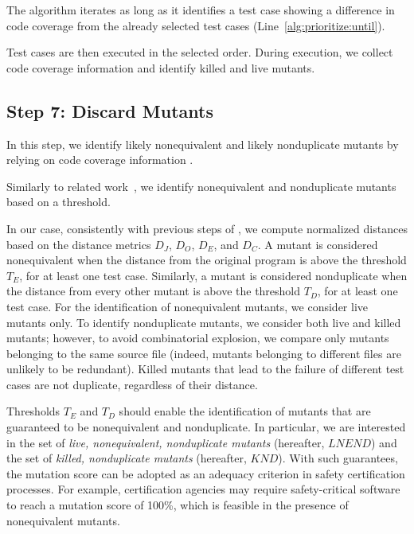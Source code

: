The algorithm iterates as long as it identifies a test case
showing a difference in code coverage from the
already selected test cases (Line~\ref{alg:prioritize:until}).

Test cases are then executed in the selected order. During  execution, we collect code coverage information and identify killed and live mutants.




\subsection{Step 7: Discard Mutants}
\label{sec:algostepSeven}


In this step, we identify likely nonequivalent and likely nonduplicate mutants by relying on code coverage information .

Similarly to related work~\cite{schuler2013covering},
we identify nonequivalent and nonduplicate mutants based on a threshold.

In our case, consistently with previous steps of \APPR,
we compute normalized distances based on the distance metrics $D_J$, $D_O$, $D_E$, and $D_C$. A mutant is considered nonequivalent when the distance from the original program is above the threshold $T_E$, for at least one test case.
Similarly, a mutant is considered nonduplicate when the distance from every other mutant is above the threshold $T_D$, for at least one test case. For the identification of nonequivalent mutants, we consider live mutants only. To identify nonduplicate mutants, we consider both live and killed mutants; however, to avoid combinatorial explosion, we compare only mutants belonging to the same source file (indeed, mutants belonging to different files are unlikely to be redundant).
Killed mutants that lead to the failure of different test cases are not duplicate, regardless of their distance.

Thresholds $T_E$ and $T_D$ should enable the identification of mutants that are guaranteed to be nonequivalent and nonduplicate. In particular, we are interested in the set of \emph{live, nonequivalent, nonduplicate mutants} (hereafter, $\mathit{LNEND}$) and the set of \emph{killed, nonduplicate mutants} (hereafter, $\mathit{KND}$). With such guarantees, the mutation score can be adopted as an adequacy criterion in safety certification processes. For example, certification agencies may require safety-critical software to reach a mutation score of 100\%, which is feasible in the presence of nonequivalent mutants.

